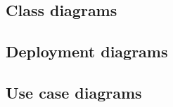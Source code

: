 \documentclass[english]{article}
\begin{document}
		\subsection{Class diagrams}
		\subsection{Deployment diagrams}
		\subsection{Use case diagrams}	
	
		
		
		
			
	
		
\end{document}
